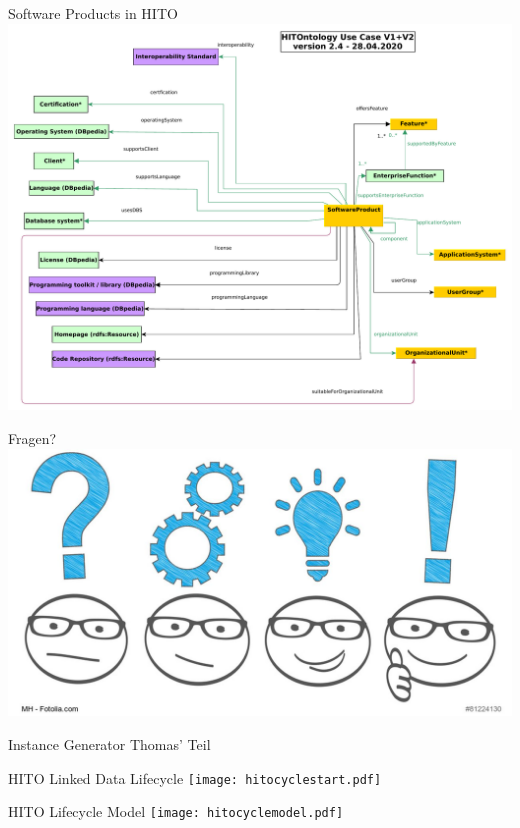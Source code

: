 \documentclass[aspectratio=1610,12pt]{beamer}
\begin{document}
\begin{frame}{Software Products in HITO}
\centering
\includegraphics[height=.8\textheight]{img/excerpt2.pdf}
\end{frame}

\begin{frame}{Fragen?}
  \centering
  \vspace{-0.5cm}
  \includegraphics[width=\textwidth]{img/fragen.png}
\end{frame}

\begin{frame}{Instance Generator}
  \centering
  \huge Thomas' Teil
\end{frame}
\begin{frame}{HITO Linked Data Lifecycle}
  \centering
  \vspace{-0.5cm}
  \texttt{[image: hitocyclestart.pdf]}
\end{frame}
\begin{frame}{HITO Lifecycle Model}
  \centering
  \vspace{-0.5cm}
  \texttt{[image: hitocyclemodel.pdf]}
\end{frame}
\end{document}
